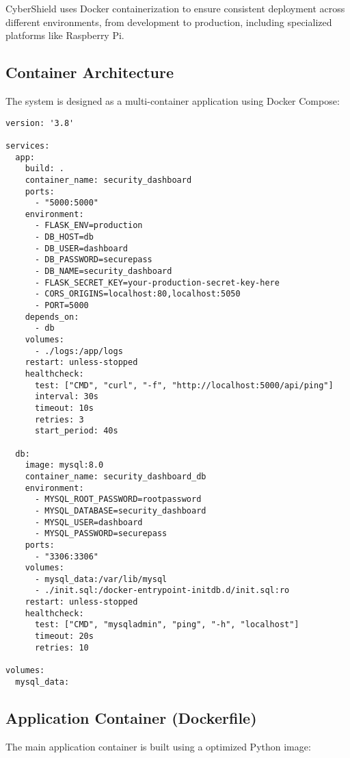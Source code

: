 \documentclass[12pt,a4paper]{report}
\begin{document}
CyberShield uses Docker containerization to ensure consistent deployment across different environments, from development to production, including specialized platforms like Raspberry Pi.

\subsection{Container Architecture}

The system is designed as a multi-container application using Docker Compose:

\begin{lstlisting}[style=dockerstyle, caption=Docker Compose Configuration]
version: '3.8'

services:
  app:
    build: .
    container_name: security_dashboard
    ports:
      - "5000:5000"
    environment:
      - FLASK_ENV=production
      - DB_HOST=db
      - DB_USER=dashboard
      - DB_PASSWORD=securepass
      - DB_NAME=security_dashboard
      - FLASK_SECRET_KEY=your-production-secret-key-here
      - CORS_ORIGINS=localhost:80,localhost:5050
      - PORT=5000
    depends_on:
      - db
    volumes:
      - ./logs:/app/logs
    restart: unless-stopped
    healthcheck:
      test: ["CMD", "curl", "-f", "http://localhost:5000/api/ping"]
      interval: 30s
      timeout: 10s
      retries: 3
      start_period: 40s

  db:
    image: mysql:8.0
    container_name: security_dashboard_db
    environment:
      - MYSQL_ROOT_PASSWORD=rootpassword
      - MYSQL_DATABASE=security_dashboard
      - MYSQL_USER=dashboard
      - MYSQL_PASSWORD=securepass
    ports:
      - "3306:3306"
    volumes:
      - mysql_data:/var/lib/mysql
      - ./init.sql:/docker-entrypoint-initdb.d/init.sql:ro
    restart: unless-stopped
    healthcheck:
      test: ["CMD", "mysqladmin", "ping", "-h", "localhost"]
      timeout: 20s
      retries: 10

volumes:
  mysql_data:
\end{lstlisting}

\subsection{Application Container (Dockerfile)}

The main application container is built using a optimized Python image:
\end{document}
